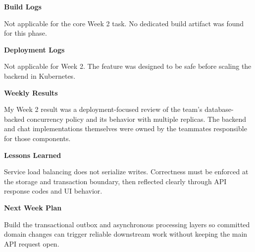 \begin{Shaded}
\begin{Highlighting}[]
 
 
\end{Highlighting}
\end{Shaded}

\vspace{0.5em}\noindent\textbf{Build Logs}\par

Not applicable for the core Week 2 task. No dedicated build artifact was
found for this phase.

\vspace{0.5em}\noindent\textbf{Deployment Logs}\par

Not applicable for Week 2. The feature was designed to be safe before
scaling the backend in Kubernetes.

\vspace{0.5em}\noindent\textbf{Weekly Results}\par

My Week 2 result was a deployment-focused review of the team's
database-backed concurrency policy and its behavior with multiple
replicas. The backend and chat implementations themselves were owned by
the teammates responsible for those components.

\vspace{0.5em}\noindent\textbf{Lessons Learned}\par

Service load balancing does not serialize writes. Correctness must be
enforced at the storage and transaction boundary, then reflected clearly
through API response codes and UI behavior.

\vspace{0.5em}\noindent\textbf{Next Week Plan}\par

Build the transactional outbox and asynchronous processing layers so
committed domain changes can trigger reliable downstream work without
keeping the main API request open.
